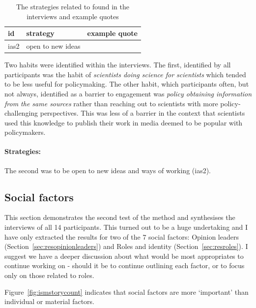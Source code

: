 \begin{table}[!ht]
\footnotesize
\caption{The strategies related to \ismih{} found in the interviews and example quotes}\label{tab:reshabitstrat}
\begin{tabular}{L{.06\linewidth}L{.3\linewidth}L{.64\linewidth}} \hline
\textbf{id} & \textbf{strategy} & \textbf{example quote} \\ \hline \hline
ias2 & open to new ideas &   \\[5mm] \hline
 \end{tabular}
\end{table}

Two habits were identified within the interviews. The first, identified by all participants was the habit of \emph{scientists doing science for scientists} which tended to be less useful for policymaking. The other habit, which participants often, but not always, identified as a barrier to engagement was \emph{policy obtaining information from the same sources} rather than reaching out to scientists with more policy-challenging perspectives. This was less of a barrier in the context that scientists used this knowledge to publish their work in media deemed to be popular with policymakers.

\paragraph{Strategies:}
 The second was to be open to new ideas and ways of working (ias2).
 
\subsection{Social factors}\label{sec:ressocial}

This section demonstrates the second test of the method and synthesises the interviews of all 14 participants. This turned out to be a huge undertaking and I have only extracted the results for two of the 7 social factors: Opinion leaders (Section~\ref{sec:resopinionleaders}) and Roles and identity (Section~\ref{sec:resroles}). I suggest we have a deeper discussion about what would be most appropriates to continue working on - should it be to continue outlining each factor, or to focus only on those related to roles.

Figure~\ref{fig:ismstorycount} indicates that social factors are more `important' than individual or material factors.

